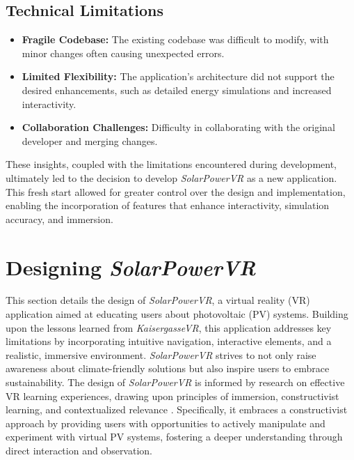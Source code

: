 \documentclass[draft, final]{vutinfth} %
\begin{document}
\subsection{Technical Limitations}
\begin{itemize}
    \item \textbf{Fragile Codebase:} The existing codebase was difficult to modify, with minor changes often causing unexpected errors.
    \item \textbf{Limited Flexibility:} The application's architecture did not support the desired enhancements, such as detailed energy simulations and increased interactivity.
    \item \textbf{Collaboration Challenges:} Difficulty in collaborating with the original developer and merging changes.
\end{itemize}

These insights, coupled with the limitations encountered during development, ultimately led to the decision to develop \textit{SolarPowerVR} as a new application. This fresh start allowed for greater control over the design and implementation, enabling the incorporation of features that enhance interactivity, simulation accuracy, and immersion.

\section{Designing \textit{SolarPowerVR}}

This section details the design of \textit{SolarPowerVR}, a virtual reality (VR) application aimed at educating users about photovoltaic (PV) systems. Building upon the lessons learned from \textit{KaisergasseVR}, this application addresses key limitations by incorporating intuitive navigation, interactive elements, and a realistic, immersive environment. \textit{SolarPowerVR} strives to not only raise awareness about climate-friendly solutions but also inspire users to embrace sustainability. The design of \textit{SolarPowerVR} is informed by research on effective VR learning experiences, drawing upon principles of immersion, constructivist learning, and contextualized relevance \cite{Dalgarno2010Learning, Gee2009Deep, HuAu2018VrExperience, Mikropoulos2011VrEducational, Winn2002Immersion}.  Specifically, it embraces a constructivist approach by providing users with opportunities to actively manipulate and experiment with virtual PV systems, fostering a deeper understanding through direct interaction and observation.
\end{document}

